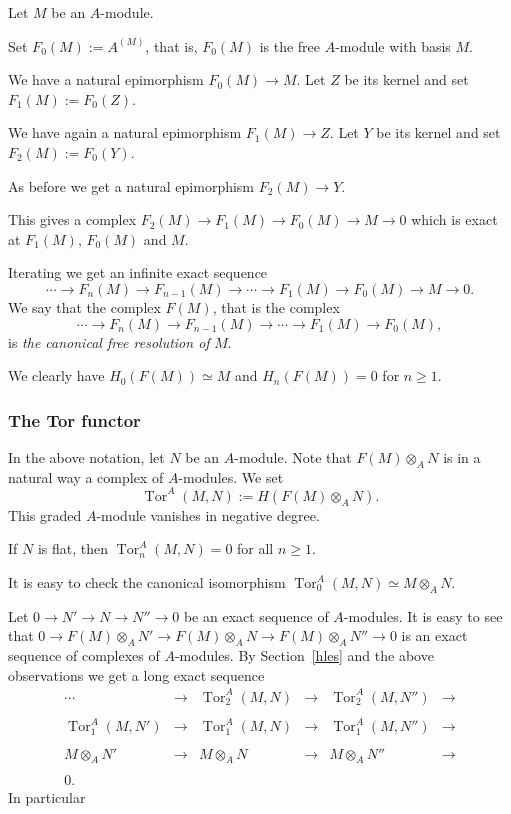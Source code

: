 \documentclass[parskip=half,fontsize=12pt]{scrartcl}%
\newcommand{\Tor}{\operatorname{Tor}}
\begin{document}
Let $M$ be an $A$-module. 

Set $F_0(M):=A^{(M)}$, that is, $F_0(M)$ is the free $A$-module with basis $M$. 

We have a natural epimorphism $F_0(M)\to M$. Let $Z$ be its kernel and set $F_1(M):=F_0(Z)$. 

We have again a natural epimorphism $F_1(M)\to Z$. Let $Y$ be its kernel and set $F_2(M):=F_0(Y)$. 

As before we get a natural epimorphism $F_2(M)\to Y$. 

This gives a complex $F_2(M)\to F_1(M)\to F_0(M)\to M\to0$ which is exact at $F_1(M)$, $F_0(M)$ and $M$. 

Iterating we get an infinite exact sequence  
$$
\cdots\to F_n(M)\to F_{n-1}(M)\to\cdots\to F_1(M)\to F_0(M)\to M\to0.
$$ 
We say that the complex $F(M)$, that is the complex 
$$
\cdots\to F_n(M)\to F_{n-1}(M)\to\cdots\to F_1(M)\to F_0(M),
$$ 
is \emph{the canonical free resolution of} $M$. 

We clearly have $H_0(F(M))\simeq M$ and $H_n(F(M))=0$ for $n\ge1$.

\subsubsection{The Tor functor}\label{Tor-f}

In the above notation, let $N$ be an $A$-module. Note that $F(M)\otimes_AN$ is in a natural way a complex of $A$-modules. We set 
$$
\Tor^A(M,N):=H(F(M)\otimes_AN).
$$ 
This graded $A$-module vanishes in negative degree. 

If $N$ is flat, then $\Tor^A_n(M,N)=0$ for all $n\ge1$.

It is easy to check the canonical isomorphism $\Tor^A_0(M,N)\simeq M\otimes_AN$.

Let $0\to N'\to N\to N''\to0$ be an exact sequence of $A$-modules. It is easy to see that $0\to F(M)\otimes_AN'\to F(M)\otimes_AN\to F(M)\otimes_AN''\to0$ is an exact sequence of complexes of $A$-modules. By Section~\ref{hles} and the above observations we get a long exact sequence 
$$
\begin{matrix}
\cdots&\to&\Tor^A_2(M,N)&\to&\Tor^A_2(M,N'')&\to\\ \\ 
\Tor^A_1(M,N')&\to&\Tor^A_1(M,N)&\to&\Tor^A_1(M,N'')&\to\\ \\ 
M\otimes_AN'&\to&M\otimes_AN&\to&M\otimes_AN''&\to\\ \\ 
0.
\end{matrix}
$$ 
In particular 
\end{document}
